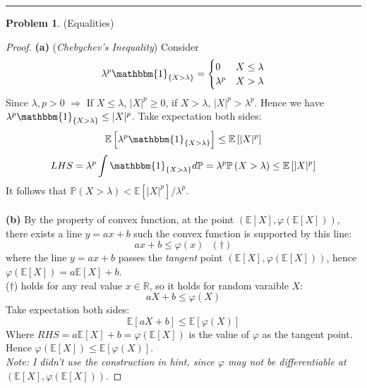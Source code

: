 \documentclass[a4paper, 10pt]{article}
\theoremstyle{definition}
\newtheorem{problem}{Problem}
\theoremstyle{hSol}
\begin{document}
\noindent\rule{16cm}{0.4pt}
\begin{problem} (Equalities)
\end{problem}
\begin{proof} \textbf{(a)} (\textit{Chebychev's Inequality}) Consider
\begin{equation}
	\lambda^p \mathbbm{1}_{\{X> \lambda\}} = \begin{cases}
	0 & X \leq \lambda\\
	\lambda^p & X > \lambda
	\end{cases}
\end{equation}
Since $\lambda, p>0$ $\Rightarrow$ If $X \leq \lambda$, $|X|^p \geq 0$, if $X>\lambda$, $|X|^p>\lambda^p$. Hence we have $\lambda^p \mathbbm{1}_{\{X> \lambda\}} \leq |X|^p$. Take expectation both sides:
\begin{equation}
	 \mathbb{E}\left[\lambda^p\mathbbm{1}_{\{X> \lambda\}}\right] \leq \mathbb{E}\left[|X|^p\right]
\end{equation}
\begin{equation}
	LHS = \lambda^p \int  \mathbbm{1}_{\{X> \lambda\}} d \mathbb{P} = \lambda^p\mathbb{P}\left(X>\lambda\right)  \leq \mathbb{E}\left[|X|^p\right]
\end{equation}
It follows that $\mathbb{P}\left(X> \lambda \right) < \mathbb{E}\left[|X|^p\right] / \lambda^p$. \\
~\\
\textbf{(b)} By the property of convex function, at the point $(\mathbb{E}\left[X\right], \varphi(\mathbb{E}\left[X\right]))$, there exists a line $y=ax+b$ such the convex function is supported by this line:
$$
a x + b \leq \varphi(x)~~~(\dag)
$$
where the line $y = ax+b $ passes the \textit{tangent} point $(\mathbb{E}\left[X\right], \varphi(\mathbb{E}\left[X\right]))$, hence $\varphi(\mathbb{E}\left[X\right]) = a \mathbb{E}\left[X\right]+b$. \\
($\dag$) holds for any real value $x\in \mathbb{R}$, so it holds for random varaible $X$:
$$
a X + b \leq \varphi(X)
$$
Take expectation both sides:
$$
\mathbb{E}\left[a X + b\right] \leq \mathbb{E}\left[\varphi(X)\right]
$$
Where $RHS= a \mathbb{E}\left[X\right]+b = \varphi(\mathbb{E}\left[X\right])$ is the value of $\varphi$ as the tangent point. Hence $\varphi(\mathbb{E}\left[X\right]) \leq \mathbb{E}\left[\varphi(X)\right]$. \\
\textit{Note: I didn't use the construction in hint, since $\varphi$ may not be differentiable at $(\mathbb{E}\left[X\right], \varphi(\mathbb{E}\left[X\right]))$}.

\end{proof}
\end{document}
